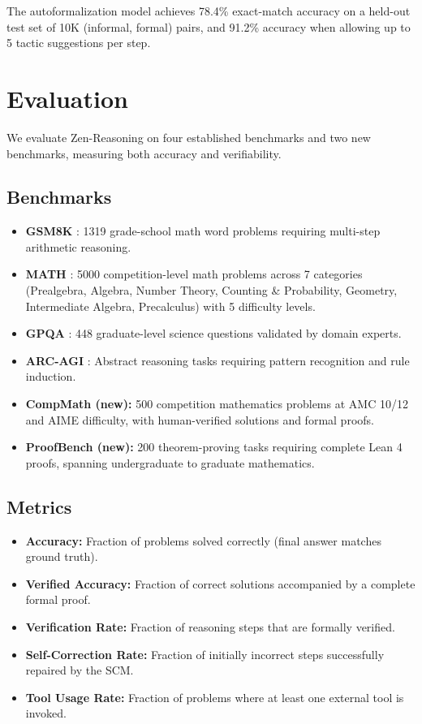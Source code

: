 \documentclass[11pt,a4paper]{article}
\begin{document}
The autoformalization model achieves 78.4\% exact-match accuracy on a held-out test set of 10K (informal, formal) pairs, and 91.2\% accuracy when allowing up to 5 tactic suggestions per step.

\section{Evaluation}
\label{sec:evaluation}

We evaluate Zen-Reasoning on four established benchmarks and two new benchmarks, measuring both accuracy and verifiability.

\subsection{Benchmarks}

\begin{itemize}
    \item \textbf{GSM8K} \citep{cobbe2021training}: 1319 grade-school math word problems requiring multi-step arithmetic reasoning.
    \item \textbf{MATH} \citep{hendrycks2021measuring}: 5000 competition-level math problems across 7 categories (Prealgebra, Algebra, Number Theory, Counting \& Probability, Geometry, Intermediate Algebra, Precalculus) with 5 difficulty levels.
    \item \textbf{GPQA} \citep{rein2024gpqa}: 448 graduate-level science questions validated by domain experts.
    \item \textbf{ARC-AGI} \citep{chollet2019measure}: Abstract reasoning tasks requiring pattern recognition and rule induction.
    \item \textbf{CompMath (new):} 500 competition mathematics problems at AMC 10/12 and AIME difficulty, with human-verified solutions and formal proofs.
    \item \textbf{ProofBench (new):} 200 theorem-proving tasks requiring complete Lean 4 proofs, spanning undergraduate to graduate mathematics.
\end{itemize}

\subsection{Metrics}

\begin{itemize}
    \item \textbf{Accuracy:} Fraction of problems solved correctly (final answer matches ground truth).
    \item \textbf{Verified Accuracy:} Fraction of correct solutions accompanied by a complete formal proof.
    \item \textbf{Verification Rate:} Fraction of reasoning steps that are formally verified.
    \item \textbf{Self-Correction Rate:} Fraction of initially incorrect steps successfully repaired by the SCM.
    \item \textbf{Tool Usage Rate:} Fraction of problems where at least one external tool is invoked.
\end{itemize}
\end{document}
